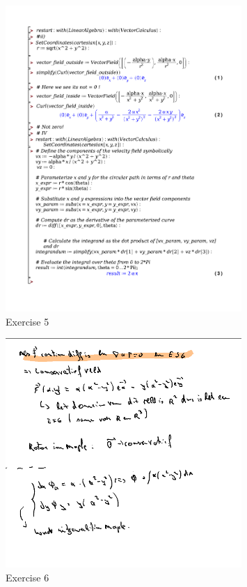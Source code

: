 \documentclass[a4paper]{report}
\begin{document}
\begin{figure}[H]
	\centering
	\includegraphics[width=0.8\textwidth]{exercises/huis_6_ex_5.pdf}
	\caption{Exercise 5}
	\label{fig:huis_6_ex_5_maple}
\end{figure}


\begin{figure}[H]
	\centering
	\includegraphics[width=0.8\textwidth]{assets/huis_6_ex_6.png}
	\caption{Exercise 6}
	\label{fig:huis_6_ex_6}
\end{figure}
\end{document}
